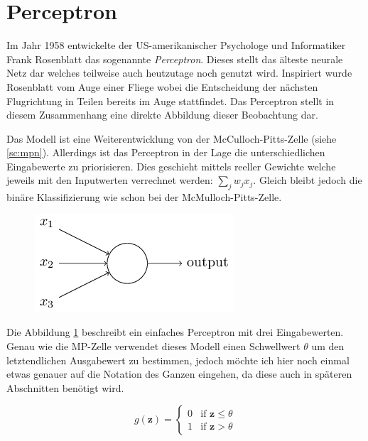 \section{Perceptron}

Im Jahr 1958 entwickelte der US-amerikanischer Psychologe und Informatiker Frank Rosenblatt das sogenannte \emph{Perceptron}. Dieses stellt das älteste neurale Netz dar welches teilweise auch heutzutage noch genutzt wird. Inspiriert wurde Rosenblatt vom Auge einer Fliege wobei die Entscheidung der nächsten Flugrichtung in Teilen bereits im Auge stattfindet. Das Perceptron stellt in diesem Zusammenhang eine direkte Abbildung dieser Beobachtung dar. 

Das Modell ist eine Weiterentwicklung von der McCulloch-Pitts-Zelle (siehe \autoref{sc:mpn}). Allerdings ist das Perceptron in der Lage die unterschiedlichen Eingabewerte zu priorisieren. Dies geschieht mittels reeller Gewichte welche jeweils mit den Inputwerten verrechnet werden: $\sum_j w_j x_j$. Gleich bleibt jedoch die binäre Klassifizierung wie schon bei der McMulloch-Pitts-Zelle. 

\begin{figure}[!htb]
	\centering
	\includegraphics[width=.5\linewidth]{./img/erstesPerceptron}
	\label{fig:erstesPerceptron}
\end{figure}

Die Abbildung \ref{fig:erstesPerceptron} beschreibt ein einfaches Perceptron mit drei Eingabewerten. Genau wie die MP-Zelle verwendet dieses Modell einen Schwellwert $\theta$ um den letztendlichen Ausgabewert zu bestimmen, jedoch möchte ich hier noch einmal etwas genauer auf die Notation des Ganzen eingehen, da diese auch in späteren Abschnitten benötigt wird. 

\begin{equation} \label{eq:1}
g(\mathbf{z}) =\begin{cases}
	0 & \mbox{if } \mathbf{z} \leq \theta \\
    1 & \mbox{if } \mathbf{z} > \theta
  \end{cases}
\end{equation}

